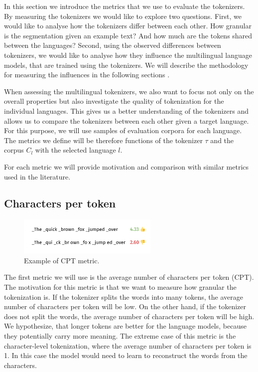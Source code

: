 In this section we introduce the metrics that we use to evaluate the tokenizers. By measuring the tokenizers we would like to explore two questions. First, we would like to analyse how the tokenizers differ between each other. How granular is the segmentation given an example text? And how much are the tokens shared between the languages? Second, using the observed differences between tokenizers, we would like to analyse how they influence the multilingual language models, that are trained using the tokenizers. We will describe the methodology for measuring the influences in the following sections .

When assessing the multilingual tokenizers, we also want to focus not only on the overall properties but also investigate the quality of tokenization for the individual languages. This gives us a better understanding of the tokenizers and allows us to compare the tokenizers between each other given a target language. For this purpose, we will use samples of evaluation corpora for each language. The metrics we define will be therefore functions of the tokenizer $\tau$ and the corpus $C_l$ with the selected language $l$. 

For each metric we will provide motivation and comparison with similar metrics used in the literature. 


\subsection{Characters per token}

\begin{figure}[h]
    \centering
    \includegraphics[width=0.6\textwidth]{img/temp/cpt_example.png}
    \caption{Example of CPT metric.}
    \label{fig:cpt_example}
\end{figure}

The first metric we will use is the average number of characters per token (CPT). The motivation for this metric is that we want to measure how granular the tokenization is. If the tokenizer splits the words into many tokens, the average number of characters per token will be low. On the other hand, if the tokenizer does not split the words, the average number of characters per token will be high. We hypothesize, that longer tokens are better for the language models, because they potentially carry more meaning. The extreme case of this metric is the character-level tokenization, where the average number of characters per token is 1. In this case the model would need to learn to reconstruct the words from the characters.

